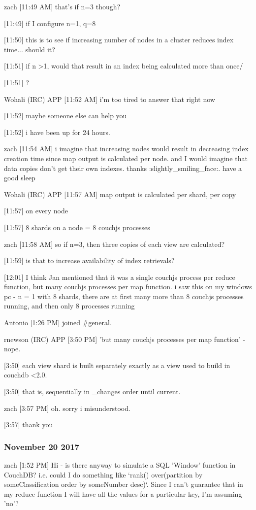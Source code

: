 zach [11:49 AM]
that's if n=3 though?

[11:49]
if I configure n=1, q=8

    [11:50]
this is to see if increasing number of nodes in a cluster reduces index time... should it?

[11:51]
if n \textgreater 1, would that result in an index being calculated more than once/

[11:51]
?

Wohali (IRC) APP [11:52 AM]
i'm too tired to answer that right now

    [11:52]
maybe someone else can help you

    [11:52]
i have been up for 24 hours.

zach [11:54 AM]
i imagine that increasing nodes would result in decreasing index creation time since map output is calculated per node. and I would imagine that data copies don't get their own indexes. thanks :slightly\_smiling\_face:. have a good sleep

Wohali (IRC) APP [11:57 AM]
map output is calculated per shard, per copy

    [11:57]
on every node

    [11:57]
8 shards on a node = 8 couchjs processes

zach [11:58 AM]
so if n=3, then three copies of each view are calculated?

[11:59]
is that to increase availability of index retrievals?

[12:01]
I think Jan mentioned that it was a single couchjs process per reduce function, but many couchjs processes per map function. i saw this on my windows pc - n = 1 with 8 shards, there are at first many more than 8 couchjs processes running, and then only 8 processes running

Antonio [1:26 PM]
joined \#general.

rnewson (IRC) APP [3:50 PM]
'but many couchjs processes per map function' - nope.

[3:50]
each view shard is built separately exactly as a view used to build in couchdb \textless 2.0.

[3:50]
that is, sequentially in \_changes order until current.

zach [3:57 PM]
oh. sorry i misunderstood.

[3:57]
thank you

\subsubsection{November 20 2017}
\label{slack-20-nov}
zach [1:52 PM]
Hi - is there anyway to simulate a SQL 'Window' function in CouchDB? i.e. could I do something like `rank() over(partition by someClassification order by someNumber desc)`. Since I can't guarantee that in my reduce function I will have all the values for a particular key, I'm assuming 'no'?

